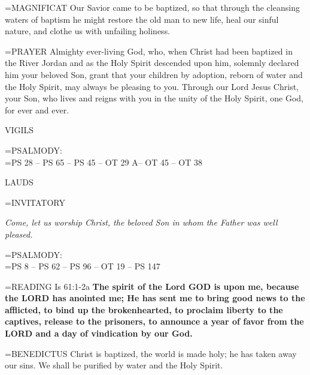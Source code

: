 \hangindent=\parindent \small{MAGNIFICAT 	Our Savior came to be baptized, so that through the cleansing waters of baptism he might restore the old man to new life, heal our sinful nature, and clothe us with unfailing holiness.\\}

\hangindent=\parindent \small{PRAYER 	Almighty ever-living God, who, when Christ had been baptized in the River Jordan and as the Holy Spirit descended upon him, solemnly declared him your beloved Son, grant that your children by adoption, reborn of water and the Holy Spirit, may always be pleasing to you. Through our Lord Jesus Christ, your Son, who lives and reigns with you in the unity of the Holy Spirit, one God, for ever and ever.}

\begin{flushleft}\normalsize VIGILS\\\end{flushleft}

\hangindent=\parindent \small{PSALMODY:}\\
\hangindent=\parindent  PS 28 -- PS 65 -- PS 45 -- OT 29 A-- OT 45 -- OT 38\vspace{0.5em}

\begin{flushleft}\normalsize LAUDS\\\end{flushleft}

\hangindent=\parindent \small{INVITATORY}
\begin{center}
\textit{Come, let us worship Christ, the beloved Son in whom the Father was well pleased.\\}
\end{center}

\hangindent=\parindent \small{PSALMODY:}\\
\hangindent=\parindent  PS 8 -- PS 62 -- PS 96 -- OT 19 -- PS 147\vspace{0.5em}

\hangindent=\parindent \small{READING}   Is 61:1-2a \textbf{ The spirit of the Lord GOD is upon me, because the LORD has anointed me; He has sent me to bring good news to the afflicted, to bind up the brokenhearted, to proclaim liberty to the captives, release to the prisoners, to announce a year of favor from the LORD and a day of vindication by our God.\\}

\hangindent=\parindent \small{BENEDICTUS 	Christ is baptized, the world is made holy; he has taken away our sins. We shall be purified by water and the Holy Spirit.\\}

